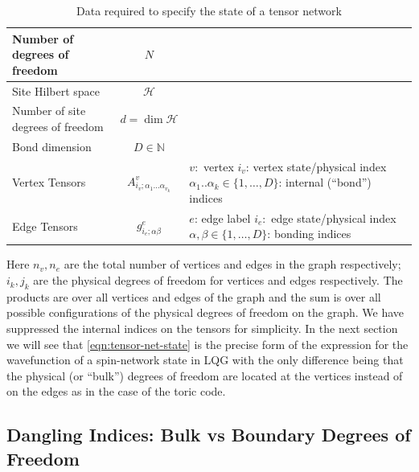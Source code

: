 \documentclass[preprint]{SciPost}
\newcommand{\mc}[1]{\mathcal{#1}}
\newcommand{\mbb}[1]{\mathbb{#1}}
\theoremstyle{plain} %
\begin{document}
\begin{table}
	\centering
	\begin{tabular}{p{6cm} c p{6cm}}
			\toprule
			Number of degrees of freedom & $ N $    &                          \\ \hline
			Site Hilbert space          & $ \mc{H} $   &                      \\ \hline
			Number of site degrees of freedom & $ d = \dim\mc{H} $	&		  \\ \hline
			Bond dimension				& $ D \in \mbb{N}$		&						  \\ \hline
			Vertex Tensors & $ A^v_{i_v; \alpha_1 \ldots \alpha_{v_k}} $ & $ v: $ vertex \newline $i_v$: vertex state/physical index \newline $\alpha_1 .. \alpha_k \in \{1,\ldots,D\}$: internal (``bond'') indices \\
			\midrule
			Edge Tensors & $ g^e_{i_e; \alpha\beta} $ &  $ e $: edge label \newline $i_e:$ edge state/physical index \newline $\alpha, \beta \in \{1,\ldots,D\}$: bonding indices \\
			\bottomrule
	\end{tabular}
	\caption{Data required to specify the state of a tensor network}
	\label{tbl:tns-data}
\end{table}

Here $ n_v, n_e $ are the total number of vertices and edges in the graph respectively; $ i_k, j_k $ are the physical degrees of freedom for vertices and edges respectively. The products are over all vertices and edges of the graph and the sum is over all possible configurations of the physical degrees of freedom on the graph. We have suppressed the internal indices on the tensors for simplicity. In the next section we will see that \eqref{eqn:tensor-net-state} is the precise form of the expression for the wavefunction of a spin-network state in LQG with the only difference being that the physical (or ``bulk'') degrees of freedom are located at the vertices instead of on the edges as in the case of the toric code.

\subsection{Dangling Indices: Bulk vs Boundary Degrees of Freedom}
\end{document}
